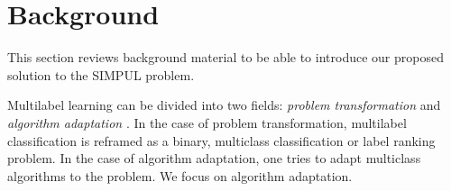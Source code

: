 
\section{Background}
\label{sec:org8c910ea}

This section reviews background material to be able to introduce our proposed solution to the SIMPUL problem.

Multilabel learning can be divided into two fields: \emph{problem transformation} and \emph{algorithm adaptation} \cite{multilabelReview}. In the case of problem transformation, multilabel classification is reframed as a binary, multiclass classification or label ranking problem. In the case of algorithm adaptation, one tries to adapt multiclass algorithms to the problem. We focus on algorithm adaptation. 

